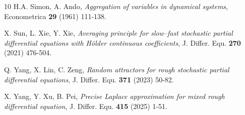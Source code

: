\documentclass[10pt,a4paper]{article}
\numberwithin{equation}{section}
\begin{document}
\begin{thebibliography}{10}
 H.A. Simon, A. Ando, \emph{Aggregation of variables in dynamical systems}, Econometrica {\bf 29} (1961) 111-138.


 X. Sun, L. Xie, Y. Xie, \emph{Averaging principle for slow--fast stochastic partial differential equations with H\"{o}lder continuous coefficients}, J. Differ. Equ. {\bf 270} (2021) 476-504.


 Q. Yang, X. Lin, C. Zeng, \emph{Random attractors for rough stochastic partial differential equations}, J. Differ. Equ. {\bf 371} (2023) 50-82.




 X. Yang, Y. Xu, B. Pei, \emph{Precise Laplace approximation for mixed rough differential equation}, J. Differ. Equ. {\bf 415} (2025) 1-51.



\end{thebibliography}
\end{document}
